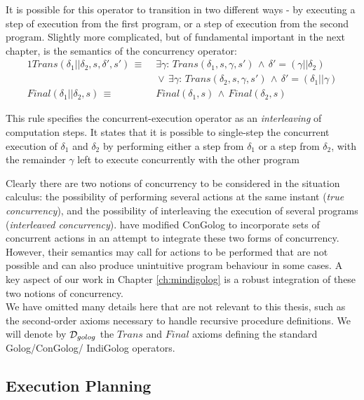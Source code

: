It is possible for this operator to transition in two different ways
- by executing a step of execution from the first program, or a step
of execution from the second program. Slightly more complicated, but
of fundamental important in the next chapter, is the semantics of
the concurrency operator:\begin{alignat*}{1}
Trans(\delta_{1}||\delta_{2},s,\delta',s')\,\equiv\, & \,\exists\gamma:\, Trans(\delta_{1},s,\gamma,s')\,\wedge\,\delta'=(\gamma||\delta_{2})\\
 & \,\vee\,\exists\gamma:\, Trans(\delta_{2},s,\gamma,s')\,\wedge\,\delta'=(\delta_{1}||\gamma)\\
Final(\delta_{1}||\delta_{2},s)\,\equiv\, & \, Final(\delta_{1},s)\,\wedge\, Final(\delta_{2},s)\end{alignat*}


This rule specifies the concurrent-execution operator as an \emph{interleaving}
of computation steps. It states that it is possible to single-step
the concurrent execution of $\delta_{1}$ and $\delta_{2}$ by performing
either a step from $\delta_{1}$ or a step from $\delta_{2}$, with
the remainder $\gamma$ left to execute concurrently with the other
program

Clearly there are two notions of concurrency to be considered in the
situation calculus: the possibility of performing several actions
at the same instant (\emph{true concurrency}), and the possibility
of interleaving the execution of several programs (\emph{interleaved
concurrency}). \citet{pinto99tcongolog} have modified ConGolog to
incorporate sets of concurrent actions in an attempt to integrate
these two forms of concurrency. However, their semantics may call
for actions to be performed that are not possible and can also produce
unintuitive program behaviour in some cases. A key aspect of our work
in Chapter \ref{ch:mindigolog} is a robust integration of these two
notions of concurrency.\\


We have omitted many details here that are not relevant to this thesis,
such as the second-order axioms necessary to handle recursive procedure
definitions. We will denote by $\mathcal{D}_{golog}$ the $Trans$ and $Final$
axioms defining the standard Golog/ConGolog/ IndiGolog operators.


\subsection{Execution Planning\label{sec:Background:Golog-Exec-Plannnig}}

